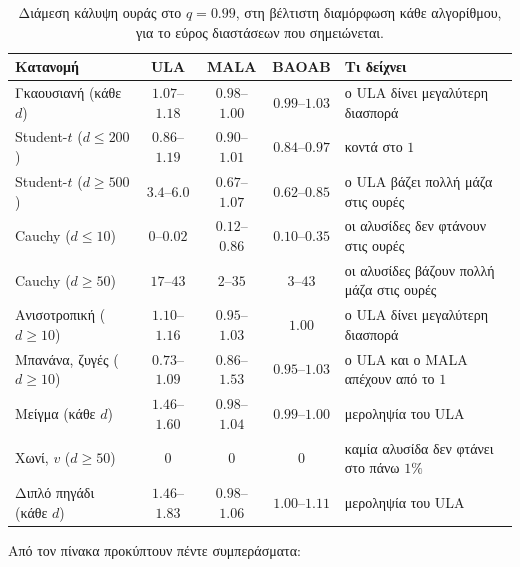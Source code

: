 \begin{table}[H]
\centering
\footnotesize
\begin{tabular}{p{3.4cm}cccp{4.2cm}}
\toprule
Κατανομή & ULA & MALA & BAOAB & Τι δείχνει \\
\midrule
Γκαουσιανή (κάθε $d$) & $1.07$--$1.18$ & $0.98$--$1.00$ & $0.99$--$1.03$ & ο ULA δίνει μεγαλύτερη διασπορά \\
Student-$t$ ($d \le 200$) & $0.86$--$1.19$ & $0.90$--$1.01$ & $0.84$--$0.97$ & κοντά στο $1$ \\
Student-$t$ ($d \ge 500$) & $3.4$--$6.0$ & $0.67$--$1.07$ & $0.62$--$0.85$ & ο ULA βάζει πολλή μάζα στις ουρές \\
Cauchy ($d \le 10$) & $0$--$0.02$ & $0.12$--$0.86$ & $0.10$--$0.35$ & οι αλυσίδες δεν φτάνουν στις ουρές \\
Cauchy ($d \ge 50$) & $17$--$43$ & $2$--$35$ & $3$--$43$ & οι αλυσίδες βάζουν πολλή μάζα στις ουρές \\
Ανισοτροπική ($d \ge 10$) & $1.10$--$1.16$ & $0.95$--$1.03$ & $1.00$ & ο ULA δίνει μεγαλύτερη διασπορά \\
Μπανάνα, ζυγές ($d \ge 10$) & $0.73$--$1.09$ & $0.86$--$1.53$ & $0.95$--$1.03$ & ο ULA και ο MALA απέχουν από το $1$ \\
Μείγμα (κάθε $d$) & $1.46$--$1.60$ & $0.98$--$1.04$ & $0.99$--$1.00$ & μεροληψία του ULA \\
Χωνί, $v$ ($d \ge 50$) & $0$ & $0$ & $0$ & καμία αλυσίδα δεν φτάνει στο πάνω $1\%$ \\
Διπλό πηγάδι (κάθε $d$) & $1.46$--$1.83$ & $0.98$--$1.06$ & $1.00$--$1.11$ & μεροληψία του ULA \\
\bottomrule
\end{tabular}
\caption{Διάμεση κάλυψη ουράς στο $q=0.99$, στη βέλτιστη διαμόρφωση κάθε
αλγορίθμου, για το εύρος διαστάσεων που σημειώνεται.}
\label{tab:geo-tails}
\end{table}

Από τον πίνακα προκύπτουν πέντε συμπεράσματα:

